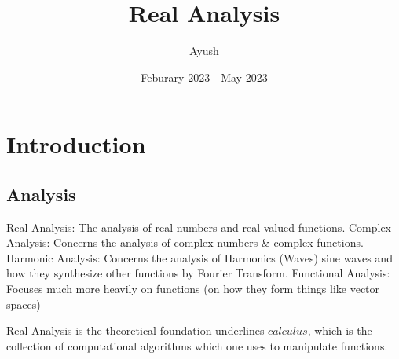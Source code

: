 \documentclass{article}
\title{Real Analysis}
\author{Ayush}
\date{Feburary 2023 - May 2023}
\begin{document}
\maketitle

\section*{Introduction}
\subsection*{Analysis}
Real Analysis: The analysis of real numbers and real-valued functions.
Complex Analysis: Concerns the analysis of complex numbers & complex functions.
Harmonic Analysis: Concerns the analysis of Harmonics (Waves) sine waves and how they synthesize other functions by Fourier Transform.
Functional Analysis: Focuses much more heavily on functions (on how they form things like vector spaces)

Real Analysis is the theoretical foundation underlines $calculus$, which is the collection of computational algorithms which one uses to manipulate functions.
\end{document}
